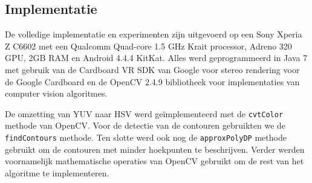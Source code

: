 %
%
%
%

\subsection{Implementatie}
De volledige implementatie en experimenten zijn uitgevoerd op een Sony Xperia Z C6602 met een Qualcomm Quad-core 1.5 GHz Krait processor, Adreno 320 GPU, 2GB RAM en Android 4.4.4 KitKat. Alles werd geprogrammeerd in Java 7 met gebruik van de Cardboard VR SDK van Google voor stereo rendering voor de Google Cardboard en de OpenCV 2.4.9 bibliotheek voor implementaties van computer vision algoritmes.

De omzetting van YUV naar HSV werd ge\"implementeerd met de \texttt{cvtColor} methode van OpenCV. Voor de detectie van de contouren gebruikten we de \texttt{findContours} methode. Ten slotte werd ook nog de \texttt{approxPolyDP} methode gebruikt om de contouren met minder hoekpunten te beschrijven. Verder werden voornamelijk mathematische operaties van OpenCV gebruikt om de rest van het algoritme te implementeren.

